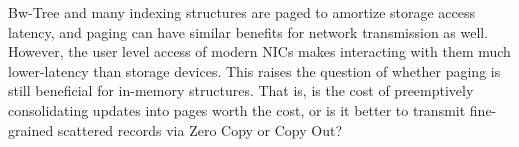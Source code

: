 Bw-Tree and many indexing structures are paged to amortize storage
access latency, and paging can have similar benefits for network transmission
as well. However, the user level access of modern NICs makes interacting with
them much lower-latency than storage devices. This raises the question of
whether paging is still beneficial for in-memory structures. That is, is the
cost of preemptively consolidating updates into pages worth the cost, or is it
better to transmit fine-grained scattered records via Zero Copy or Copy Out?

%




